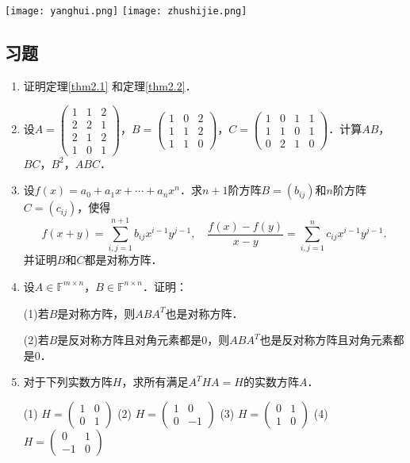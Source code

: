 \documentclass[a4paper,fontset=windows]{ctexbook}
\theoremstyle{definition}
\begin{document}
\begin{center}
\texttt{[image: yanghui.png]}\hspace{1in}
\texttt{[image: zhushijie.png]}
\end{center}

\subsection*{习题}

\begin{enumerate}
\item 证明定理\ref{thm2.1} 和定理\ref{thm2.2}．

\item 设$A=\begin{pmatrix}1&1&2 \\ 2&2&1 \\ 2&1&2 \\ 1&0&1\end{pmatrix}$，$B=\begin{pmatrix}1&0&2 \\ 1&1&2 \\ 1&1&0\end{pmatrix}$，$C=\begin{pmatrix}1&0&1&1 \\ 1&1&0&1 \\ 0&2&1&0\end{pmatrix}$．计算$AB$，$BC$，$B^2$，$ABC$．

\item 设$f(x)=a_0+a_1x+\cdots+a_nx^n$．求$n+1$阶方阵$B=(b_{ij})$和$n$阶方阵$C=(c_{ij})$，使得
$$f(x+y)=\sum_{i,j=1}^{n+1}b_{ij}x^{i-1}y^{j-1}, \quad
\frac{f(x)-f(y)}{x-y}=\sum_{i,j=1}^nc_{ij}x^{i-1}y^{j-1}.$$
并证明$B$和$C$都是对称方阵．

\item 设$A\in\mathbb{F}^{m\times n}$，$B\in\mathbb{F}^{n\times n}$．证明：

(1)若$B$是对称方阵，则$ABA^T$也是对称方阵．

(2)若$B$是反对称方阵且对角元素都是0，则$ABA^T$也是反对称方阵且对角元素都是0．

\item 对于下列实数方阵$H$，求所有满足$A^THA=H$的实数方阵$A$．

(1) $H=\begin{pmatrix}1&0 \\ 0&1\end{pmatrix}$ \quad
(2) $H=\begin{pmatrix}1&0 \\ 0&-1\end{pmatrix}$ \quad
(3) $H=\begin{pmatrix}0&1 \\ 1&0\end{pmatrix}$ \quad
(4) $H=\begin{pmatrix}0&1 \\ -1&0\end{pmatrix}$


\end{enumerate}
\end{document}
